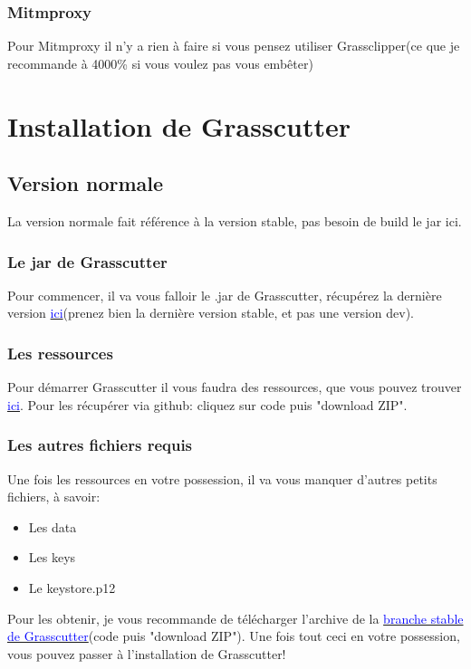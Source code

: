 \documentclass{article}
\begin{document}
\subsubsection{Mitmproxy}
Pour Mitmproxy il n'y a rien à faire si vous pensez utiliser Grassclipper(ce que je recommande à 4000\% si vous voulez pas vous embêter)

\section{Installation de Grasscutter}

\subsection{Version normale}
La version normale fait référence à la version stable, pas besoin de build le jar ici.

\subsubsection{Le jar de Grasscutter}
Pour commencer, il va vous falloir le .jar de Grasscutter, récupérez la dernière version \href{https://github.com/Grasscutters/Grasscutter/releases}{\textcolor{blue}{ici}}(prenez bien la dernière version stable, et pas une version dev).

\subsubsection{Les ressources}
Pour démarrer Grasscutter il vous faudra des ressources, que vous pouvez trouver \href{https://github.com/Koko-boya/Grasscutter_Resources/tree/main}{\textcolor{blue}{ici}}. Pour les récupérer via github: cliquez sur code puis "download ZIP".

\subsubsection{Les autres fichiers requis}
Une fois les ressources en votre possession, il va vous manquer d'autres petits fichiers, à savoir:
\begin{itemize}
	\item Les data
	\item Les keys
	\item Le keystore.p12
\end{itemize}

Pour les obtenir, je vous recommande de télécharger l'archive de la \href{https://github.com/Grasscutters/Grasscutter/tree/stable}{\textcolor{blue}{branche stable de Grasscutter}}(code puis "download ZIP").\newline
Une fois tout ceci en votre possession, vous pouvez passer à l'installation de Grasscutter!
\end{document}
